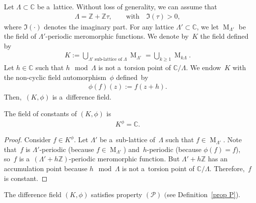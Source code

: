 Let $\Lambda \subset \mathbb C$ be a~lattice.
Without loss of generality, we can assume that
\begin{gather*}
\Lambda=\mathbb Z +\mathbb Z \tau, \qquad \text{with} \quad \Im (\tau)>0,
\end{gather*}
where $\Im(\cdot)$ denotes the imaginary part.
For any lattice $\Lambda' \subset \mathbb C$, we let $\operatorname{M}_{\Lambda'}$ be the f\/ield of $\Lambda'$-periodic
meromorphic functions.
We denote by~$K$ the f\/ield def\/ined by
\begin{gather*}
K:= \bigcup_{\Lambda' \; \text{sub-lattice of} \; \Lambda} \operatorname{M}_{\Lambda'} =\bigcup_{k \geq 1} \operatorname{M}_{k  \Lambda}.
\end{gather*}
Let $h \in \mathbb C$ such that $h \mod \Lambda$ is not a~torsion point of $\mathbb C/\Lambda$.
We endow~$K$ with the non-cyclic f\/ield automorphism~$\phi$ def\/ined~by
\begin{gather*}
\phi(f)(z):=f(z+h).
\end{gather*}
Then,~$(K,\phi)$ is a~dif\/ference f\/ield.

\begin{Proposition}
The field of constants of $(K,\phi)$ is
\begin{gather*}
K^{\phi}=\mathbb C.
\end{gather*}
\end{Proposition}

\begin{proof}
Consider $f\in K^{\phi}$.
Let $\Lambda'$ be a~sub-lattice of~$\Lambda$ such that $f \in \operatorname{M}_{\Lambda'}$.
Note that~$f$ is $\Lambda'$-periodic (because $f \in \operatorname{M}_{\Lambda'}$) and~$h$-periodic (because
$\phi(f)=f$), so~$f$ is a~$(\Lambda' + h\mathbb Z)$-periodic meromorphic function.
But $\Lambda' + h\mathbb Z$ has an accumulation point because $h \mod \Lambda$ is not a~torsion point of $\mathbb
C/\Lambda$.
Therefore,~$f$ is constant.
\end{proof}

\begin{Proposition}
The difference field $(K,\phi)$ satisfies property $(\mathcal{P})$ $($see Definition~{\rm \ref{prop P})}.
\end{Proposition}


